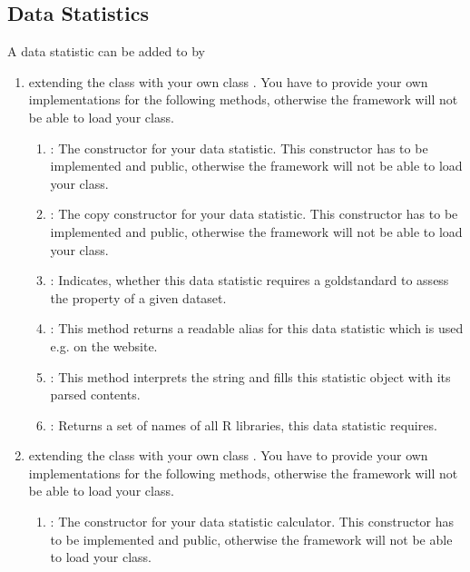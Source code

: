 	\subsection{Data Statistics}\label{subsec_extend_datastats}
	A data statistic  can be added to \clusteval by
	\begin{enumerate}
		\item extending the class  with your own class . You have to provide your own implementations for the following methods, otherwise the framework will not be able to load your class.
		\begin{enumerate}
			\item {}: The constructor for your data statistic. This constructor has to be implemented and public, otherwise the framework will not be able to load your class.
			\item {}: The copy constructor for your data statistic. This constructor has to be implemented and public, otherwise the framework will not be able to load your class.
			\item {}: Indicates, whether this data statistic requires a goldstandard to assess the property of a given dataset.
			\item {}: This method returns a readable alias for this data statistic which is used e.g. on the website.
			\item {}: This method interprets the string and fills this statistic object with its parsed contents.
			\item {}: Returns a set of names of all R libraries, this data statistic requires.
		\end{enumerate}
		\item extending the class  with your own class . You have to provide your own implementations for the following methods, otherwise the framework will not be able to load your class.
		\begin{enumerate}
			\item {}: The constructor for your data statistic calculator. This constructor has to be implemented and public, otherwise the framework will not be able to load your class.

\end{enumerate}
\end{enumerate}
